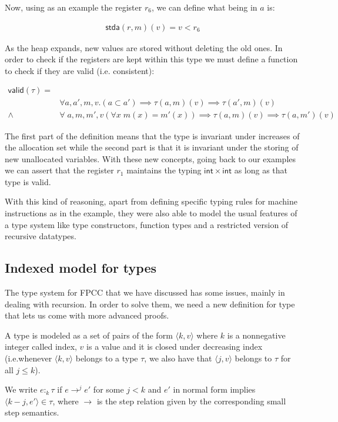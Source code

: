 \documentclass{article}
\begin{document}
Now, using as an example the register $r_6$, we can 
define what being in $a$ is:

\begin{align*}
    \mathsf{stda}(r,m)(v)=v<r_6
\end{align*}

As the heap expands, new values are stored without 
deleting the old ones. In order to check if the 
registers are kept within this type we must define 
a function to check if they are valid (i.e. 
consistent):

\begin{align*}
  \mathsf{valid}(\tau)=&\\
  &\forall a,a',m,v. (a \subset a') \implies 
    \tau(a,m)(v) \implies \tau(a',m)(v)\\
  \wedge&\forall\;a,m,m',v (\forall x\;m(x)=m'(x))
    \implies \tau(a,m)(v) \implies \tau(a,m')(v)
\end{align*}

The first part of the definition means that the type 
is invariant under increases of the allocation set
while the second part is that it is invariant under 
the storing of new unallocated variables. With these
new concepts, going back to our examples we can
assert that the register $r_1$ maintains the typing 
$\mathsf{int}\times\mathsf{int}$ as long as that 
type is valid. 

With this kind of reasoning, apart from defining 
specific typing rules for machine instructions as in the 
example, they were also able to model the usual features 
of a type system like type constructors, function types 
and a restricted version of recursive datatypes.

\subsection*{Indexed model for types}

The type system for FPCC that we have discussed has 
some issues, mainly in dealing with recursion. 
In order to solve them, we need a new definition for
type that lets us come with more advanced proofs.

A type is modeled as a set of pairs of the form 
$\langle k, v \rangle$ where $k$ is a nonnegative integer called 
index, $v$ is a value and it is closed under decreasing index 
(i.e.whenever $\langle k, v \rangle$ belongs to a type $\tau$, 
we also have that $\langle j, v \rangle$ belongs to 
$\tau$ for all $j \leq k$).

We write $e :_k \tau$ if $e \rightarrow^j e'$ for some $j < k$ 
and $e'$ in normal form implies 
$\langle k - j, e'\rangle \in \tau$, where $\rightarrow$ 
is the step relation given by the corresponding small step 
semantics.
\end{document}
